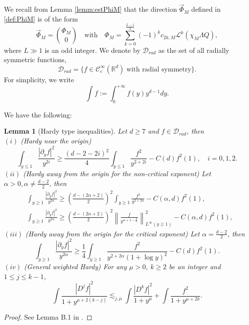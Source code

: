 \documentclass[11pt]{aims}
\newtheorem{lemma}[theorem]{Lemma}
\theoremstyle{definition}
\numberwithin{equation}{section}
\begin{document}
We recall from Lemma \ref{lemm:estPhiM} that the direction $\vec \Phi_M$ defined in \eqref{def:PhiM} is of the form 
\begin{equation}\label{def:fromPhiM}
\vec \Phi_M = \binom{\Phi_M}{0} \quad \text{with} \quad \Phi_M = \sum_{k = 0}^{\frac{L-1}2}(-1)^kc_{2k,M}{\mathscr{L}}^k(\chi_M \Lambda Q),
\end{equation}
where $L \gg 1$ is an odd integer. We denote by ${\mathcal{D}}_{rad}$ as the set of all radially symmetric functions,
$${\mathcal{D}}_{rad} = \{f \in {\mathcal{C}}_c^\infty({\mathbb{R}^d}) \; \text{with radial symmetry}\}.$$
For simplicity, we write
$$\int f := \int_0^{+\infty} f(y)y^{d-1}dy.$$

We have the following:
\begin{lemma}[Hardy type inequalities]\label{lemm:Hardy} Let $d \geq 7$ and $f \in {\mathcal{D}}_{rad}$, then\\
$(i)$ (Hardy near the origin)
\begin{equation*}
\int_{y \leq 1} \frac{|{\partial_y} f|^2}{y^{2i}} \geq \frac{(d - 2 - 2i)^2}{4}\int_{y\leq 1} \frac{f^2}{y^{2+2i}} - C(d)f^2(1), \quad i = 0, 1, 2.
\end{equation*}
$(ii)$ (Hardy away from the origin for the non-critical exponent) Let $\alpha > 0, \alpha \ne \frac{d-2}{2}$, then
\begin{align}
&\int_{y \geq 1} \frac{|{\partial_y} f|^2}{y^{2\alpha}} \geq \left(\frac{d - (2\alpha + 2)}{2}\right)^2\int_{y \geq 1} \frac{f^2}{y^{2 + 2\alpha}} - C(\alpha,d)f^2(1),\label{eq:Hardy0}\\
&\int_{y \geq 1} \frac{|{\partial_y} f|^2}{y^{2\alpha}} \geq \left(\frac{d - (2\alpha + 2)}{2}\right)^2\left\| \frac{f}{y^{ \alpha + 1 - \frac d2}}\right\|^2_{L^\infty(y \geq 1)} - C(\alpha,d)f^2(1),\label{eq:Hardy1}
\end{align}
$(iii)$ (Hardy away from the origin for the critical exponent) Let $\alpha = \frac{d-2}{2}$, then
$$
\int_{y \geq 1} \frac{|{\partial_y} f|^2}{y^{2\alpha}} \geq \frac 14 \int_{y \geq 1} \frac{f^2}{y^{2 + 2\alpha} (1 + \log y)^2} - C(d)f^2(1).$$
$(iv)$ (General weighted Hardy) For any $\mu > 0$, $k \geq 2$ be an integer and $1 \leq j \leq k-1$,
\begin{equation}\label{eq:genHardy}
\int \frac{|D^jf|^2}{1 + y^{\mu + 2(k - j)}} \lesssim_{j,\mu} \int \frac{|D^k f|^2}{1 + y^\mu} + \int \frac{f^2}{1 + y^{\mu + 2k}}.
\end{equation}
\end{lemma}
\begin{proof} See Lemma B.1 in \cite{MRRcjm15}.
\end{proof}
\end{document}
